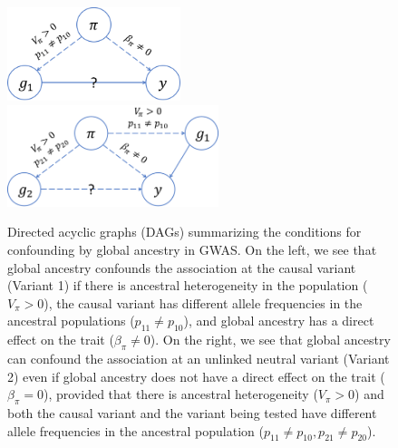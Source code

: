 \documentclass[12pt]{article}
\begin{document}
\begin{figure}
\includegraphics[width=0.45\textwidth]{figs/finalfigs/fig6a_dag_gwas_1_v2.png}\hspace{0.1in}
\includegraphics[width=0.55\textwidth]{figs/finalfigs/fig6b_dag_gwas_2_v2.png}
\caption{Directed acyclic graphs (DAGs) summarizing the conditions for confounding by global ancestry in GWAS. On the left, we see that global ancestry confounds the association at the causal variant (Variant 1) if there is ancestral heterogeneity in the population ($V_\pi > 0$), the causal variant has different allele frequencies in the ancestral populations ($p_{11} \neq p_{10}$), and global ancestry has a direct effect on the trait ($\beta_\pi \neq 0$). On the right, we see that global ancestry can confound the association at an unlinked neutral variant (Variant 2) even if global ancestry does not have a direct effect on the trait ($\beta_\pi = 0$), provided that there is ancestral heterogeneity ($V_\pi > 0$) and both the causal variant and the variant being tested have different allele frequencies in the ancestral population ($p_{11} \neq p_{10}, p_{21} \neq p_{20}$).}
\label{fig:confoundingdags}
\end{figure}
\end{document}
